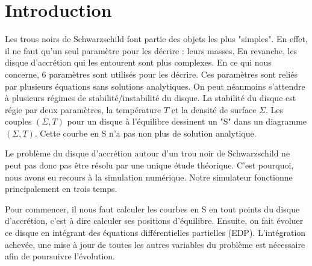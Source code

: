 \section*{Introduction}

Les trous noirs de Schwarzschild font partie des objets les plus "simples". En effet, il ne faut qu'un seul paramètre pour les décrire : leurs masses. En revanche, les disque d'accrétion qui les entourent sont plus complexes. En ce qui nous concerne, 6 paramètres sont utilisés pour les décrire. Ces paramètres sont reliés par plusieurs équations sans solutions analytiques. On peut néanmoins s'attendre à plusieurs régimes de stabilité/instabilité du disque. La stabilité du disque est régie par deux paramètres, la température  $T$ et la densité de surface $\Sigma$. Les couples $(\Sigma, T)$ pour un disque à l'équilibre dessinent un "S" dans un diagramme $(\Sigma, T)$. Cette courbe en S n'a pas non plus de solution analytique. 

Le problème du disque d'accrétion autour d'un trou noir de Schwarzschild ne peut pas donc pas être résolu par une unique étude théorique. C'est pourquoi, nous avons eu recours à la simulation numérique. Notre simulateur fonctionne principalement en trois temps.

Pour commencer, il nous faut calculer les courbes en S en tout points du disque d'accrétion, c'est à dire calculer ses positions d'équilibre. Ensuite, on fait évoluer ce disque en intégrant des équations différentielles partielles (EDP). L'intégration achevée, une mise à jour de toutes les autres variables du problème est nécessaire afin de poursuivre l'évolution. 

